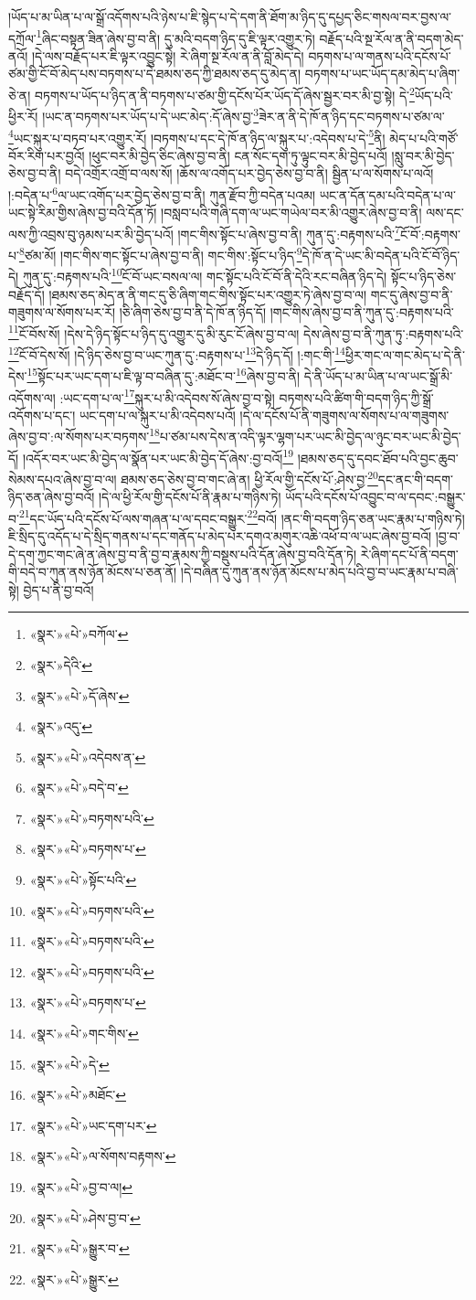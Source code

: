 །ཡོད་པ་མ་ཡིན་པ་ལ་སྒྲོ་འདོགས་པའི་ཉེས་པ་ཇི་སྙེད་པ་དེ་དག་ནི་ཐོག་མ་ཉིད་དུ་དཔྱད་ཅིང་གསལ་བར་བྱས་ལ་དཀྲོལ་\footnote{«སྣར་»«པེ་»བཀོལ་}ཞིང་བསྟན་ཟིན་ཞེས་བྱ་བ་ནི། དུ་མའི་བདག་ཉིད་དུ་ཇི་ལྟར་འགྱུར་ཏེ། བརྗོད་པའི་སྔ་རོལ་ན་ནི་བདག་མེད་ནའོ། །དེ་ལས་བརྗོད་པར་ཇི་ལྟར་འབྱུང་སྟེ། རེ་ཞིག་སྔ་རོལ་ན་ནི་བློ་མེད་དེ། བཏགས་པ་ལ་གནས་པའི་དངོས་པོ་ཙམ་གྱི་ངོ་བོ་མེད་པས་བཏགས་པ་དེ་ཐམས་ཅད་ཀྱི་ཐམས་ཅད་དུ་མེད་ན། བཏགས་པ་ཡང་ཡོད་དམ་མེད་པ་ཞིག་ཅེ་ན། བཏགས་པ་ཡོད་པ་ཉིད་ན་ནི་བཏགས་པ་ཙམ་གྱི་དངོས་པོར་ཡོད་དོ་ཞེས་སྦྱར་བར་མི་བྱ་སྟེ། དེ་\footnote{«སྣར་»དེའི་}ཡོད་པའི་ཕྱིར་རོ། །ཡང་ན་བཏགས་པར་ཡོད་པ་དེ་ཡང་མེད་:དོ་ཞེས་བྱ་\footnote{«སྣར་»«པེ་»དོ་ཞེས་}ཟེར་ན་ནི་དེ་ཁོ་ན་ཉིད་དང་བཏགས་པ་ཙམ་ལ་\footnote{«སྣར་»འདུ་}ཡང་སྐུར་པ་བཏབ་པར་འགྱུར་རོ། །བཏགས་པ་དང་དེ་ཁོ་ན་ཉིད་ལ་སྐུར་པ་:འདེབས་པ་དེ་\footnote{«སྣར་»«པེ་»འདེབས་ན་}ནི། མེད་པ་པའི་གཙོ་བོར་རིག་པར་བྱའོ། །ཕུང་བར་མི་བྱེད་ཅིང་ཞེས་བྱ་བ་ནི། ངན་སོང་དག་ཏུ་ལྟུང་བར་མི་བྱེད་པའོ། །སླུ་བར་མི་བྱེད་ཅེས་བྱ་བ་ནི། བདེ་འགྲོར་འགྲོ་བ་ལས་སོ། །ཆོས་ལ་འགོད་པར་བྱེད་ཅེས་བྱ་བ་ནི། སྦྱིན་པ་ལ་སོགས་པ་ལའོ། །:བདེན་པ་\footnote{«སྣར་»«པེ་»བདེ་བ་}ལ་ཡང་འགོད་པར་བྱེད་ཅེས་བྱ་བ་ནི། ཀུན་རྫོབ་ཀྱི་བདེན་པའམ། ཡང་ན་དོན་དམ་པའི་བདེན་པ་ལ་ཡང་སྟེ་རིམ་གྱིས་ཞེས་བྱ་བའི་དོན་ཏོ། །བསླབ་པའི་གཞི་དག་ལ་ཡང་གཡེལ་བར་མི་འགྱུར་ཞེས་བྱ་བ་ནི། ལས་དང་ལས་ཀྱི་འབྲས་བུ་ཉམས་པར་མི་བྱེད་པའོ། །གང་གིས་སྟོང་པ་ཞེས་བྱ་བ་ནི། ཀུན་དུ་:བརྟགས་པའི་\footnote{«སྣར་»«པེ་»བཏགས་པའི་}ངོ་བོ་:བརྟགས་པ་\footnote{«སྣར་»«པེ་»བཏགས་པ་}ཙམ་མོ། །གང་གིས་གང་སྟོང་པ་ཞེས་བྱ་བ་ནི། གང་གིས་:སྟོང་པ་ཉིད་\footnote{«སྣར་»«པེ་»སྟོང་པའི་}དེ་ཁོ་ན་དེ་ཡང་མི་བདེན་པའི་ངོ་བོ་ཉིད་དེ། ཀུན་དུ་:བརྟགས་པའི་\footnote{«སྣར་»«པེ་»བཏགས་པའི་}ངོ་བོ་ཡང་བསལ་ལ། གང་སྟོང་པའི་ངོ་བོ་ནི་དེའི་རང་བཞིན་ཉིད་དེ། སྟོང་པ་ཉིད་ཅེས་བརྗོད་དོ། །ཐམས་ཅད་མེད་ན་ནི་གང་དུ་ཅི་ཞིག་གང་གིས་སྟོང་པར་འགྱུར་ཏེ་ཞེས་བྱ་བ་ལ། གང་དུ་ཞེས་བྱ་བ་ནི་གཟུགས་ལ་སོགས་པར་རོ། །ཅི་ཞིག་ཅེས་བྱ་བ་ནི་དེ་ཁོ་ན་ཉིད་དོ། །གང་གིས་ཞེས་བྱ་བ་ནི་ཀུན་དུ་:བརྟགས་པའི་\footnote{«སྣར་»«པེ་»བཏགས་པའི་}ངོ་བོས་སོ། །དེས་དེ་ཉིད་སྟོང་པ་ཉིད་དུ་འགྱུར་དུ་མི་རུང་ངོ་ཞེས་བྱ་བ་ལ། དེས་ཞེས་བྱ་བ་ནི་ཀུན་ཏུ་:བརྟགས་པའི་\footnote{«སྣར་»«པེ་»བཏགས་པའི་}ངོ་བོ་དེས་སོ། །དེ་ཉིད་ཅེས་བྱ་བ་ཡང་ཀུན་དུ་:བརྟགས་པ་\footnote{«སྣར་»«པེ་»བཏགས་པ་}དེ་ཉིད་དོ། །:གང་གི་\footnote{«སྣར་»«པེ་»གང་གིས་}ཕྱིར་གང་ལ་གང་མེད་པ་དེ་ནི་དེས་\footnote{«སྣར་»«པེ་»དེ་}སྟོང་པར་ཡང་དག་པ་ཇི་ལྟ་བ་བཞིན་དུ་:མཐོང་བ་\footnote{«སྣར་»«པེ་»མཐོང་}ཞེས་བྱ་བ་ནི། དེ་ནི་ཡོད་པ་མ་ཡིན་པ་ལ་ཡང་སྒྲོ་མི་འདོགས་ལ། :ཡང་དག་པ་ལ་\footnote{«སྣར་»«པེ་»ཡང་དག་པར་}སྐུར་པ་མི་འདེབས་སོ་ཞེས་བྱ་བ་སྟེ། བཏགས་པའི་ཚིག་གི་བདག་ཉིད་ཀྱི་སྒྲོ་འདོགས་པ་དང་། ཡང་དག་པ་ལ་སྐུར་པ་མི་འདེབས་པའོ། །དེ་ལ་དངོས་པོ་ནི་གཟུགས་ལ་སོགས་པ་ལ་གཟུགས་ཞེས་བྱ་བ་:ལ་སོགས་པར་བཏགས་\footnote{«སྣར་»«པེ་»ལ་སོགས་བརྟགས་}པ་ཙམ་པས་དེས་ན་འདི་ལྟར་ལྷག་པར་ཡང་མི་བྱེད་ལ་ཉུང་བར་ཡང་མི་བྱེད་དོ། །འདོར་བར་ཡང་མི་བྱེད་ལ་སྣོན་པར་ཡང་མི་བྱེད་དོ་ཞེས་:བྱ་བའོ།\footnote{«སྣར་»«པེ་»བྱ་བ་ལ།} །ཐམས་ཅད་དུ་དབང་ཐོབ་པའི་བྱང་ཆུབ་སེམས་དཔའ་ཞེས་བྱ་བ་ལ། ཐམས་ཅད་ཅེས་བྱ་བ་གང་ཞེ་ན། ཕྱི་རོལ་གྱི་དངོས་པོ་:ཤེས་བྱ་\footnote{«སྣར་»«པེ་»ཤེས་བྱ་བ་}དང་ནང་གི་བདག་ཉིད་ཅན་ཞེས་བྱ་བའོ། །དེ་ལ་ཕྱི་རོལ་གྱི་དངོས་པོ་ནི་རྣམ་པ་གཉིས་ཏེ། ཡོད་པའི་དངོས་པོ་འབྱུང་བ་ལ་དབང་:བསྒྱུར་བ་\footnote{«སྣར་»«པེ་»སྒྱུར་བ་}དང་ཡོད་པའི་དངོས་པོ་ལས་གཞན་པ་ལ་དབང་བསྒྱུར་\footnote{«སྣར་»«པེ་»སྒྱུར་}བའོ། །ནང་གི་བདག་ཉིད་ཅན་ཡང་རྣམ་པ་གཉིས་ཏེ། ཇི་སྲིད་དུ་འདོད་པ་དེ་སྲིད་གནས་པ་དང་གནོད་པ་མེད་པར་དགའ་མགུར་འཆི་འཕོ་བ་ལ་ཡང་ཞེས་བྱ་བའོ། །བྱ་བ་དེ་དག་ཀྱང་གང་ཞེ་ན་ཞེས་བྱ་བ་ནི་བྱ་བ་རྣམས་ཀྱི་བསྡུས་པའི་དོན་ཞེས་བྱ་བའི་དོན་ཏེ། རེ་ཞིག་དང་པོ་ནི་བདག་གི་བདེ་བ་ཀུན་ནས་ཉོན་མོངས་པ་ཅན་ནོ། །དེ་བཞིན་དུ་ཀུན་ནས་ཉོན་མོངས་པ་མེད་པའི་བྱ་བ་ཡང་རྣམ་པ་བཞི་སྟེ། བྱེད་པ་ནི་བྱ་བའོ། 